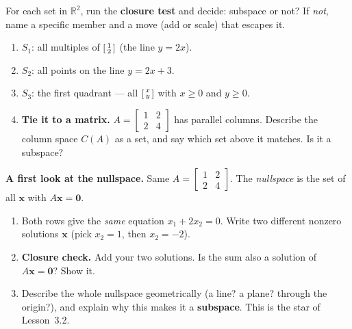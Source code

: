 \documentclass[10pt]{article}
\newcommand{\zero}{\mathbf{0}}
\begin{document}
\begin{tcolorbox}[colback=white, colframe=black!40, title=\textbf{Tier A --- Approaching Proficiency},
    fonttitle=\bfseries, arc=1.5mm, left=3mm, right=3mm, top=2mm, bottom=2mm, breakable]
For each set in $\mathbb{R}^2$, run the \textbf{closure test} and decide: subspace or not? If
\emph{not}, name a specific member and a move (add or scale) that escapes it.
\begin{enumerate}[leftmargin=1.7em, itemsep=9pt]
  \item $S_1$: all multiples of $\begin{bsmallmatrix} 1\\2 \end{bsmallmatrix}$ (the line $y=2x$).
  \item $S_2$: all points on the line $y=2x+3$. 
  \item $S_3$: the first quadrant --- all $\begin{bsmallmatrix} x\\y \end{bsmallmatrix}$ with
        $x\ge 0$ and $y\ge 0$. 
  \item \textbf{Tie it to a matrix.} $A=\begin{bmatrix} 1 & 2 \\ 2 & 4 \end{bmatrix}$ has parallel
        columns. Describe the column space $C(A)$ as a set, and say which set above it matches. Is
        it a subspace? 
\end{enumerate}
\end{tcolorbox}

\begin{tcolorbox}[colback=white, colframe=black!40, title=\textbf{Tier E --- Extension},
    fonttitle=\bfseries, arc=1.5mm, left=3mm, right=3mm, top=2mm, bottom=2mm, breakable]
\textbf{A first look at the nullspace.} Same $A=\begin{bmatrix} 1 & 2 \\ 2 & 4 \end{bmatrix}$. The
\emph{nullspace} is the set of all $\mathbf x$ with $A\mathbf x=\zero$.
\begin{enumerate}[leftmargin=1.7em, itemsep=9pt]
  \item Both rows give the \emph{same} equation $x_1+2x_2=0$. Write two different nonzero
        solutions $\mathbf x$ (pick $x_2=1$, then $x_2=-2$). 
  \item \textbf{Closure check.} Add your two solutions. Is the sum also a solution of
        $A\mathbf x=\zero$? Show it. 
  \item Describe the whole nullspace geometrically (a line? a plane? through the origin?), and
        explain why this makes it a \textbf{subspace}. This is the star of Lesson~3.2. 
\end{enumerate}
\end{tcolorbox}
\end{document}
